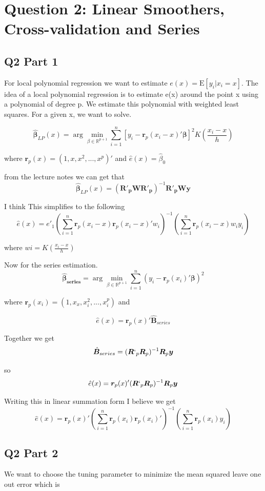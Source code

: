 \documentclass[11pt]{article}
\newcommand{\E}{\mathrm{E}}
\newcommand{\R}{\mathbb{R}}
\begin{document}
\section{Question 2: Linear Smoothers, Cross-validation and Series}

\subsection{Q2 Part 1}
For local polynomial regression we want to estimate $e(x) = \E[y_i|x_i = x]$. The idea of a local polynomial regression is to estimate e(x) around the point x using a polynomial of degree p. We estimate this polynomial with weighted least squares. For a given x, we want to solve. 

$$\hat{\bm{\beta}}_{LP}(x) = \arg \min_{\beta \in \R^{p+1}} \sum_{i=1}^{n}[y_i - \bm{r}_p(x_i - x)'\bm{\beta}]^2K(\frac{x_i-x}{h})
$$

where $ \bm{r}_p(x) = (1,x,x^2,...,x^p)'$ and $\hat{e}(x) = \hat{\beta}_0$

from the lecture notes we can get that 
$$\hat{\bm{\beta}}_{LP}(x) = (\bm{R'_pWR'_p})^{-1}\bm{R'_pWy}
$$

I think This simplifies to the following 
$$\hat{e}(x)= e'_1 \left( \sum_{i=1}^{n} \bm{r}_p(x_i-x)\bm{r}_p(x_i-x)'w_i\right)^{-1} \left( \sum_{i=1}^{n} \bm{r}_p(x_i - x)w_iy_i \right)
$$

where $ wi = K(\frac{x_i - x}{h}) $

Now for the series estimation. 
$$  \bm{\hat{\beta}_{series}} = \arg \min_{\beta \in \R^{p+1}} \sum_{i=1}^{n}(y_i -\bm{r}_p(x_i)'\bm{\beta})^2
	$$
	
where $ \bm{r}_p(x_i) = (1,x_x,x_i^2, ..., x_i^p)$ and 

$$\hat{e}(x) = \bm{r}_p(x)'\hat{\bm{B}}_{series}$$

Together we get 
$$ \hat{\bm{B}}_{series} = (\bm{R}`_p \bm{R}_p)^{-1}\bm{R}_p\bm{y}
$$

so 
$$\hat{e}(x) = \bm{r}_p(x)'(\bm{R}`_p \bm{R}_p)^{-1}\bm{R}_p\bm{y}$$

Writing this in linear summation form I believe we get 
$$\hat{e}(x) =  \bm{r}_p(x)' \left( \sum_{i=1}^{n}\bm{r}_p(x_i)\bm{r}_p(x_i)'\right)^{-1} \left( \sum_{i=1}^{n} \bm{r}_p(x_i)y_i \right)$$

\subsection{Q2 Part 2}
We want to choose the tuning parameter to minimize the mean squared leave one out error which is 
\end{document}
